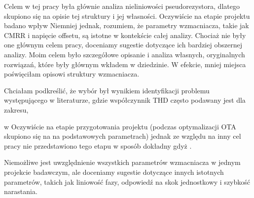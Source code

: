 \begin{frame}[t]
    \begin{block}{\dk}
    \end{block}

     Celem w tej pracy była głównie analiza nieliniowości pseudorezystora, dlatego skupiono się na opisie tej struktury i jej własności. 
     Oczywiście na etapie projektu  badano wpływ 
     Niemniej jednak, rozumiem, że parametry wzmacniacza, takie jak CMRR i napięcie offsetu, są istotne w kontekście całej analizy. Chociaż nie były one głównym celem  pracy, doceniamy sugestie dotyczące ich bardziej obszernej analizy.
     Moim celem było szczegółowe opisanie i analiza własnych, oryginalnych rozwiązań, które były głównym wkładem w dziedzinie. W efekcie, mniej miejsca poświęciłam opisowi struktury wzmacniacza.  
\end{frame}

\begin{frame}[t]
    \begin{block}{\dk}
    \end{block}


    Chciałam podkreślić, że wybór był wynikiem identyfikacji problemu występującego w literaturze, gdzie współczynnik THD często podawany jest dla zakresu,
    
    w
    Oczywiście na etapie przygotowania projektu (podczas optymalizacji OTA skupiono się na na podstawowych parametrach) jednak ze względu na inny cel pracy nie przedstawiono tego etapu w sposób dokładny gdyż
 . 

    Niemożliwe jest uwzględnienie wszystkich parametrów wzmacniacza w jednym projekcie badawczym, ale doceniamy sugestie dotyczące innych istotnych parametrów, takich jak liniowość fazy, odpowiedź na skok jednostkowy i szybkość narastania. 

\end{frame}

